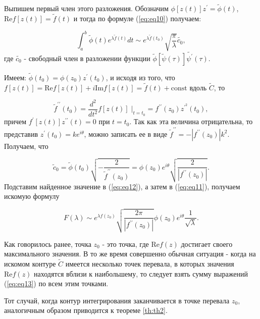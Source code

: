 \documentclass[%
bachelor,    %
natbib,      %
subf,        %
href,        %
colorlinks,  %
]{disser}
\renewcommand{\Re}{\mathrm{Re}}
\renewcommand{\Im}{\mathrm{Im}}
\newcommand{\const}{\mathrm{const}}
\begin{document}
	Выпишем первый член этого разложения. Обозначим $\phi[z(t)]z^\prime = \widetilde{\phi}(t)$, $\Re f[z(t)] = \widetilde{f}(t)$ и тогда по формуле (\ref{eq:eq10}) получаем:
	
	\begin{equation}\label{eq:eq12}
	\int_{a}^{b} \widetilde{\phi}(t) e^{\lambda \widetilde{f}(t)}dt \sim e^{\lambda \widetilde{f}(t_0)} \sqrt{\frac{\pi}{\lambda}} \widetilde{c_0},
	\end{equation}
	где $\widetilde{c_0}$ - свободный член в разложении функции $\widetilde{\phi}[\widetilde{\psi}(\tau)]\widetilde{\psi^\prime}(\tau)$.
	
	Имеем: $\widetilde{\phi}(t_0) = \phi(z_0) z^\prime (t_0)$, и исходя из того, что $f[z(t)] = \Re f[z(t)]+ i \Im f[z(t)] = \widetilde{f}(t)+\const$ вдоль $\widetilde{C}$, то
	
	\begin{equation}\nonumber
	\widetilde{f}^{\prime\prime} (t_0) = \frac{d^2}{d t^2} f[z(t)]\;|_{t=t_0} = f^{\prime\prime} (z_0) z^{\prime^2} (t_0),
	\end{equation}
	причем $f^\prime[z(t)] z^{\prime \prime} (t) = 0$ при $t=t_0$. Так как эта величина отрицательна, то представив $z^\prime (t_0) = k e^{i \theta}$, можно записать ее в виде $\widetilde{f}^{\prime\prime}=-|f^{\prime\prime}(z_0)| k^2$. Получаем, что 
	
	\begin{equation}\nonumber
	\widetilde{c}_0=\widetilde{\phi}(t_0) \sqrt{-\frac{2}{\widetilde{f}^{\prime\prime}(z_0)}}= \phi (z_0) e^{i \theta} \sqrt{\frac{2}{|f^{\prime\prime}(z_0)|}}.
	\end{equation}
	Подставим найденное значение в (\ref{eq:eq12}), а затем в (\ref{eq:eq11}), получаем искомую формулу
	
	\begin{equation}\label{eq:eq13}
	F(\lambda) \sim e^{\lambda f (z_0)}\sqrt{\frac{2\pi}{|f^{\prime \prime} (z_0)|}} \phi(z_0) e^{i \theta} \frac{1}{\sqrt{\lambda}}.
	\end{equation}
	
	Как говорилось ранее, точка $z_0$ - это точка, где $\Re f(z)$ достигает своего максимального значения. В то же время совершенно обычная ситуация - когда на искомом контуре $\widetilde{C}$ имеется несколько точек перевала, в которых значения $\Re f (z)$ находятся вблизи к наибольшему, то следует взять сумму выражений (\ref{eq:eq13}) по всем этим точками. 
	
	Тот случай, когда контур интегрирования заканчивается в точке перевала $z_0$, аналогичным образом приводится к теореме \ref{th:th2}.
	
\end{document}
